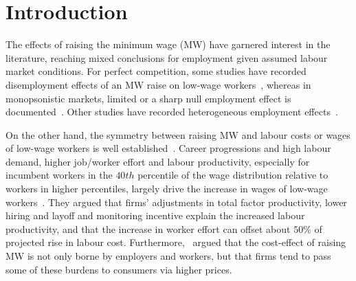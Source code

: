 \documentclass[authoryear, preprint, twocolumn, 1p]{elsarticle}
\begin{document}


    \section{Introduction}\label{sec:introduction}
    The effects of raising the minimum wage (MW) have garnered interest in the literature, reaching mixed conclusions for employment given assumed labour market conditions. For perfect competition, some studies have recorded disemployment effects of an MW raise on low-wage workers~\citep{stigler1946economics, hamermesh1982minimum, neumark1992employment, brown1999minimum, machin2004minimum, neumark2000minimum, borjas2010labor}, whereas in monopsonistic markets, limited or a sharp null employment effect is documented~\citep{lester1960employment, card1993minimum, card2000minimum, aaronson2018industry, cengiz2019effect, wong2019minimum, dustmann2022reallocation}. Other studies have recorded heterogeneous employment effects~\citep{okudaira2019minimum, medrano2023minimum, meer2023effects, gregory2022minimum}.

    On the other hand, the symmetry between raising MW and labour costs or wages of low-wage workers is well established~\citep{medrano2023minimum,clemens2023important}. Career progressions and high labour demand, higher job/worker effort and labour productivity, especially for incumbent workers in the $40th$ percentile of the wage distribution relative to workers in higher percentiles, largely drive the increase in wages of low-wage workers~\citep{riley2017raising, kim2019minimum, wong2019minimum, baek2021impact, zhao2021effects, seok2022macroeconomic, ku2022does, coviello2022minimum, alexandre2022minimum}. They argued that firms' adjustments in total factor productivity, lower hiring and layoff and monitoring incentive explain the increased labour productivity, and that the increase in worker effort can offset about $50\%$ of projected rise in labour cost. Furthermore,~\citet{harasztosi2019pays} argued that the cost-effect of raising MW is not only borne by employers and workers, but that firms tend to pass some of these burdens to consumers via higher prices.
\end{document}
